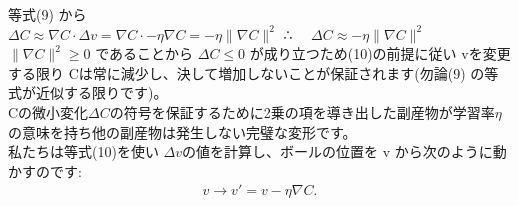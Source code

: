 \documentclass[11pt,a4j,fleqn]{jarticle}
\begin{document}
等式(9) から\\
\hspace{1.0cm} $ \Delta C \approx \nabla C \cdot \Delta v = \nabla C \cdot -\eta \nabla C =  -\eta \|\nabla C\|^2$
\hspace{1.0cm} ∴　 $\Delta C \approx -\eta \|\nabla C\|^2$ \\
$\|
\nabla C \|^2 \geq 0$ であることから $\Delta C \leq 0$ が成り立つため(10)の前提に従い vを変更する限り Cは常に減少し、決して増加しないことが保証されます(勿論(9) の等式が近似する限りです)。\\
  Cの微小変化$\Delta C$の符号を保証するために2乗の項を導き出した副産物が学習率$\eta$の意味を持ち他の副産物は発生しない完璧な変形です。\\
私たちは等式(10)を使い $\Delta v$の値を計算し、ボールの位置を v から次のように動かすのです:\\
\begin{eqnarray}
  v \rightarrow v' = v -\eta \nabla C.
\end{eqnarray}
\end{document}
